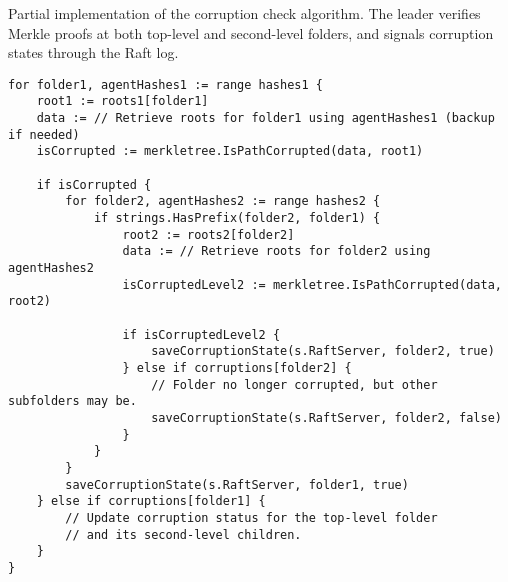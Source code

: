 \begin{listing}[H]
\caption{Partial implementation of the corruption check algorithm. The leader
verifies Merkle proofs at both top-level and second-level folders, and signals corruption states through the Raft log.}
\begin{verbatim}
for folder1, agentHashes1 := range hashes1 {
    root1 := roots1[folder1]
    data := // Retrieve roots for folder1 using agentHashes1 (backup if needed)
    isCorrupted := merkletree.IsPathCorrupted(data, root1)

    if isCorrupted {
        for folder2, agentHashes2 := range hashes2 {
            if strings.HasPrefix(folder2, folder1) {
                root2 := roots2[folder2]
                data := // Retrieve roots for folder2 using agentHashes2
                isCorruptedLevel2 := merkletree.IsPathCorrupted(data, root2)

                if isCorruptedLevel2 {
                    saveCorruptionState(s.RaftServer, folder2, true)
                } else if corruptions[folder2] {
                    // Folder no longer corrupted, but other subfolders may be.
                    saveCorruptionState(s.RaftServer, folder2, false)
                }
            }
        }
        saveCorruptionState(s.RaftServer, folder1, true)
    } else if corruptions[folder1] {
        // Update corruption status for the top-level folder
        // and its second-level children.
    }
}
\end{verbatim}
\end{listing}
